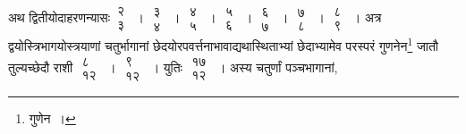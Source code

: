 \documentclass[10pt, openany]{book}
\begin{document}
{अथ द्वितीयोदाहरणन्यासः\textendash \,$\begin{matrix}

\mbox{{२}}\\

\mbox{{३}}

\end{matrix}$~। $\begin{matrix}

\mbox{{३}}\\

\mbox{{४}}

\end{matrix}$~। $\begin{matrix}

\mbox{{४}}\\

\mbox{{५}}

\end{matrix}$~। $\begin{matrix}

\mbox{{५}}\\

\mbox{{६}}

\end{matrix}$~। $\begin{matrix}

\mbox{{६}}\\

\mbox{{७}}

\end{matrix}$~। $\begin{matrix}

\mbox{{७}}\\

\mbox{{८}}

\end{matrix}$~। $\begin{matrix}

\mbox{{८}}\\

\mbox{{९}}

\end{matrix}$~। अत्र द्वयोस्त्रिभागयोस्त्रयाणां चतुर्भागानां छेदयोरपवर्त्तनाभावाद्यथास्थिताभ्यां छेदाभ्यामेव परस्परं}
{गुणनेन\renewcommand{\thefootnote}{\s ६}\footnote{\s गुणेन~।} जातौ तुल्यच्छेदौ राशी $\begin{matrix}

\mbox{{८}}\\

\mbox{{१२}}

\end{matrix}$~। $\begin{matrix}

\mbox{{९}}\\

\mbox{{१२}}

\end{matrix}$~। युतिः $\begin{matrix}

\mbox{{१७}}\\

\mbox{{१२}}

\end{matrix}$~। अस्य चतुर्णां पञ्चभागानां,}
\end{document}
